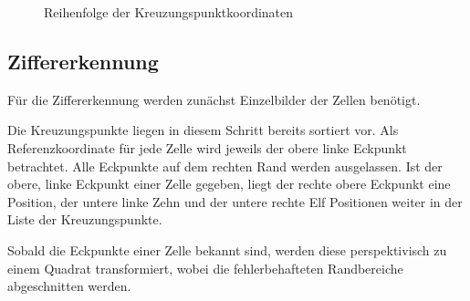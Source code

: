 \begin{figure}[H]
    \hfill
    \caption{Reihenfolge der Kreuzungspunktkoordinaten}
\end{figure}


\subsection{Ziffererkennung}
Für die Ziffererkennung werden zunächst Einzelbilder der Zellen benötigt.

Die Kreuzungspunkte liegen in diesem Schritt bereits sortiert vor.
Als Referenzkoordinate für jede Zelle wird jeweils der obere linke Eckpunkt betrachtet.
Alle Eckpunkte auf dem rechten Rand werden ausgelassen.
Ist der obere, linke Eckpunkt einer Zelle gegeben, liegt der rechte obere Eckpunkt eine Position, der untere linke Zehn und der untere rechte Elf Positionen weiter in der Liste der Kreuzungspunkte.

Sobald die Eckpunkte einer Zelle bekannt sind, werden diese perspektivisch zu einem Quadrat transformiert, wobei die fehlerbehafteten Randbereiche abgeschnitten werden.

